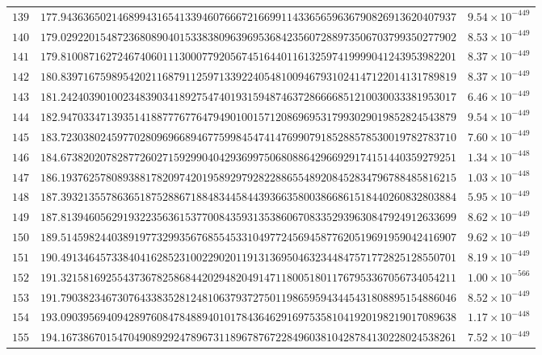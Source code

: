 \documentclass[12pt,reqno]{amsart}
\theoremstyle{remark}
\begin{document}
\begin{longtable}{clc}
$139$ & $177.9436365021468994316541339460766672166991143365659636790826913620407937$ & $9.54\times 10^{-449}$ \\
$140$ & $179.0292201548723680890401533838096396953684235607288973506703799350277902$ & $8.53\times 10^{-449}$ \\
$141$ & $179.8100871627246740601113000779205674516440116132597419999041243953982201$ & $8.37\times 10^{-449}$ \\
$142$ & $180.8397167598954202116879112597133922405481009467931024147122014131789819$ & $8.37\times 10^{-449}$ \\
$143$ & $181.2424039010023483903418927547401931594874637286666851210030033381953017$ & $6.46\times 10^{-449}$ \\
$144$ & $182.9470334713935141887776776479490100157120869695317993029019852824543879$ & $9.54\times 10^{-449}$ \\
$145$ & $183.7230380245977028096966894677599845474147699079185288578530019782783710$ & $7.60\times 10^{-449}$ \\
$146$ & $184.6738202078287726027159299040429369975068088642966929174151440359279251$ & $1.34\times 10^{-448}$ \\
$147$ & $186.1937625780893881782097420195892979282288655489208452834796788485816215$ & $1.03\times 10^{-448}$ \\
$148$ & $187.3932135578636518752886718848344584439366358003866861518440260832803884$ & $5.95\times 10^{-449}$ \\
$149$ & $187.8139460562919322356361537700843593135386067083352939630847924912633699$ & $8.62\times 10^{-449}$ \\
$150$ & $189.5145982440389197732993567685545331049772456945877620519691959042416907$ & $9.62\times 10^{-449}$ \\
$151$ & $190.4913464573384041628523100229020119131369504632344847571772825128550701$ & $8.19\times 10^{-449}$ \\
$152$ & $191.3215816925543736782586844202948204914711800518011767953367056734054211$ & $1.00\times 10^{-566}$ \\
$153$ & $191.7903823467307643383528124810637937275011986595943445431808895154886046$ & $8.52\times 10^{-449}$ \\
$154$ & $193.0903956940942897608478488940101784364629169753581041920198219017089638$ & $1.17\times 10^{-448}$ \\
$155$ & $194.1673867015470490892924789673118967876722849603810428784130228024538261$ & $7.52\times 10^{-449}$ \\

\end{longtable}
\end{document}
